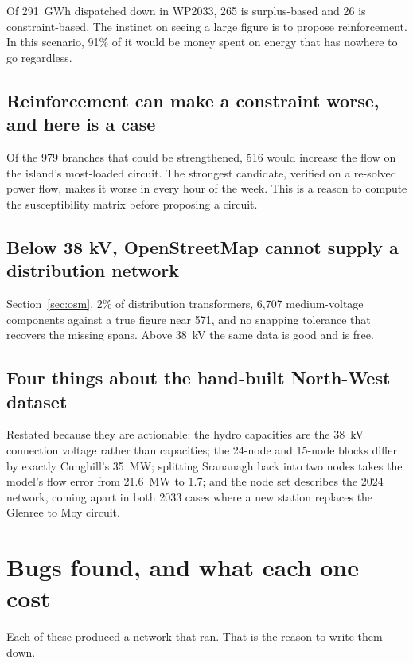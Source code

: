 \documentclass[11pt,a4paper]{article}
\begin{document}
Of 291~GWh dispatched down in WP2033, 265 is surplus-based and 26 is
constraint-based. The instinct on seeing a large figure is to propose
reinforcement. In this scenario, 91\% of it would be money spent on energy
that has nowhere to go regardless.

\subsection{Reinforcement can make a constraint worse, and here is a case}

Of the 979 branches that could be strengthened, 516 would increase the flow on
the island's most-loaded circuit. The strongest candidate, verified on a
re-solved power flow, makes it worse in every hour of the week. This is a
reason to compute the susceptibility matrix before proposing a circuit.

\subsection{Below 38 kV, OpenStreetMap cannot supply a distribution network}

Section~\ref{sec:osm}. 2\% of distribution transformers, 6{,}707 medium-voltage
components against a true figure near 571, and no snapping tolerance that
recovers the missing spans. Above 38~kV the same data is good and is free.

\subsection{Four things about the hand-built North-West dataset}

Restated because they are actionable: the hydro capacities are the 38~kV
connection voltage rather than capacities; the 24-node and 15-node blocks
differ by exactly Cunghill's 35~MW; splitting Srananagh back into two nodes
takes the model's flow error from 21.6~MW to 1.7; and the node set describes
the 2024 network, coming apart in both 2033 cases where a new station replaces
the Glenree to Moy circuit.

\clearpage
\section{Bugs found, and what each one cost}

Each of these produced a network that ran. That is the reason to write them
down.
\end{document}
